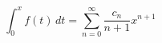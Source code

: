 \documentclass[landscape, 10pt]{article}
\newcommand{\R}{\mathbb{R}}
\begin{document}
\begin{multicols}{3}
\begin{equation*}
                            \int_0^xf(t)\,dt
                            =\sum_{n=0}^
                            \infty\frac{c_n}{n+1}x^{n+1}
                     \end{equation*}

\end{multicols}
\end{document}

